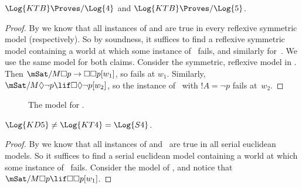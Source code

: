 \documentclass[../../../include/open-logic-section]{subfiles}
\begin{document}
\begin{thm}
  $\Log{KTB} \Proves/ \Log{4}$ and $\Log{KTB} \Proves/ \Log{5}$.
\end{thm}

\begin{proof}
  By  we know that all instances of
   and  are true in every reflexive symmetric model
  (respectively). So by soundness, it suffices to find a reflexive
  symmetric model containing a world at which some instance of~
  fails, and similarly for~.  We use the same model for both
  claims. Consider the symmetric, reflexive model in
  .  Then $\mSat/{M}{\Box p \to \Box \Box
    p}[w_1]$, so  fails at $w_1$. Similarly, $\mSat/{M}{\Diamond
    \lnot p \lif \Box \Diamond \lnot p}[w_2]$, so the instance
  of~ with $!A = \lnot p$ fails at~$w_2$.
\end{proof}

\begin{figure}[htpb]
  \centering
  \caption{The model for .}
\end{figure}

\begin{thm}
  $\Log{KD5} \neq \Log{KT4} = \Log{S4}$.
\end{thm}

\begin{proof}
  By  we know that all instances of
   and~ are true in all serial euclidean models.
  So  it suffices to find a serial euclidean model containing a world
  at which some instance of~ fails.  Consider the model of
  , and notice that $\mSat/{M}{\Box p
  \lif \Box\Box p}[w_1]$. 
\end{proof}
\end{document}
